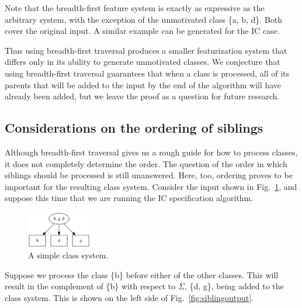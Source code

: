 \documentclass[12pt, oneside]{article}   	%
\begin{document}
Note that the breadth-first feature system is exactly as expressive as the arbitrary system, with the exception of the unmotivated class \{a, b, d\}. Both cover the original input. A similar example can be generated for the IC case.

Thus using breadth-first traversal produces a smaller featurization system that differs only in its ability to generate unmotivated classes. We conjecture that using breadth-first traversal guarantees that when a class is processed, all of its parents that will be added to the input by the end of the algorithm will have already been added, but we leave the proof as a question for future research.

\subsection{Considerations on the ordering of siblings}
\label{app:siblings}

Although breadth-first traversal gives us a rough guide for how to process classes, it does not completely determine the order. The question of the order in which siblings should be processed is still unanswered. Here, too, ordering proves to be important for the resulting class system. Consider the input shown in Fig.~\ref{fig:siblinginput}, and suppose this time that we are running the IC specification algorithm.

\begin{figure}[htb!]
	\centering
	\includegraphics[width=0.25\textwidth]{sibling_input.png}
	\caption{A simple class system.}
	\label{fig:siblinginput}
\end{figure}

Suppose we process the class \{b\} before either of the other classes. This will result in the complement of \{b\} with respect to $\Sigma$, \{d, g\}, being added to the class system. This is shown on the left side of Fig.~\ref{fig:siblingoutput}.
\end{document}
